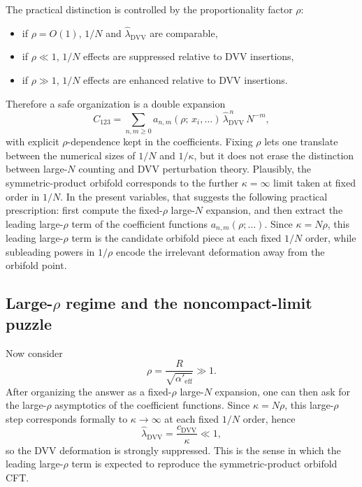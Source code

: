 \documentclass[11pt]{article}
\newcommand{\Aeff}{\alpha'_{\mathrm{eff}}}
\begin{document}
The practical distinction is controlled by the proportionality factor $\rho$:
\begin{itemize}
\item if $\rho=O(1)$, $1/N$ and $\widehat\lambda_{\mathrm{DVV}}$ are comparable,
\item if $\rho\ll 1$, $1/N$ effects are suppressed relative to DVV insertions,
\item if $\rho\gg 1$, $1/N$ effects are enhanced relative to DVV insertions.
\end{itemize}
Therefore a safe organization is a double expansion
\begin{equation}
C_{123}
=
\sum_{n,m\ge 0}
a_{n,m}\!\left(\rho;\,x_i,\ldots\right)\,
\widehat\lambda_{\mathrm{DVV}}^{\,n}\,N^{-m},
\end{equation}
with explicit $\rho$-dependence kept in the coefficients. Fixing $\rho$ lets one
translate between the numerical sizes of $1/N$ and $1/\kappa$, but it does not
erase the distinction between large-$N$ counting and DVV perturbation theory.
Plausibly, the symmetric-product orbifold corresponds to the further
$\kappa=\infty$ limit taken at fixed order in $1/N$. In the present variables,
that suggests the following practical prescription: first compute the
fixed-$\rho$ large-$N$ expansion, and then extract the leading large-$\rho$
term of the coefficient functions $a_{n,m}(\rho;\ldots)$. Since
$\kappa=N\rho$, this leading large-$\rho$ term is the candidate orbifold piece
at each fixed $1/N$ order, while subleading powers in $1/\rho$ encode the
irrelevant deformation away from the orbifold point.

\subsection{Large-\texorpdfstring{$\rho$}{rho} regime and the noncompact-limit puzzle}
Now consider
\begin{equation}\label{eq:rho-large}
\rho=\frac{R}{\sqrt{\Aeff}}\gg 1.
\end{equation}
After organizing the answer as a fixed-$\rho$ large-$N$ expansion, one can then
ask for the large-$\rho$ asymptotics of the coefficient functions. Since
$\kappa=N\rho$, this large-$\rho$ step corresponds formally to
$\kappa\to\infty$ at each fixed $1/N$ order, hence
\begin{equation}
\widehat\lambda_{\mathrm{DVV}}=\frac{c_{\mathrm{DVV}}}{\kappa}\ll 1,
\end{equation}
so the DVV deformation is strongly suppressed. This is the sense in which the
leading large-$\rho$ term is expected to reproduce the symmetric-product
orbifold CFT.
\end{document}
